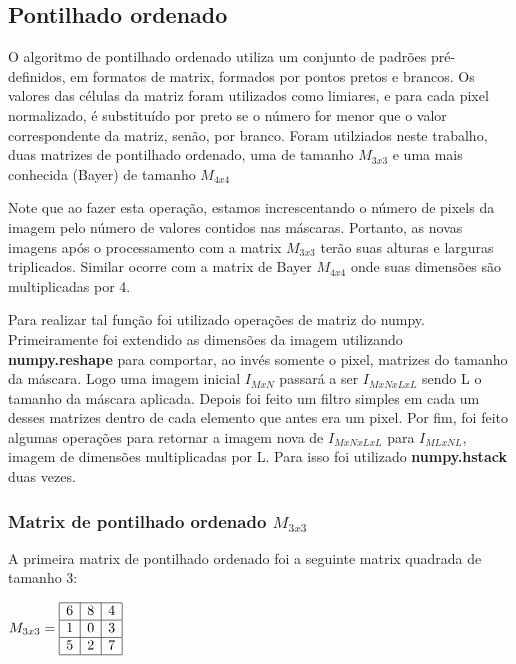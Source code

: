 \documentclass{article}
\begin{document}
\subsection{Pontilhado ordenado}

O algoritmo de pontilhado ordenado utiliza um conjunto de padrões pré-definidos, em formatos de matrix, formados por pontos pretos e brancos. Os valores das células da matriz foram utilizados como limiares, e para cada pixel normalizado, é substituído por preto se o número for menor que o valor correspondente da matriz, senão, por branco. Foram utilziados neste trabalho, duas matrizes de pontilhado ordenado, uma de tamanho $ M_{3x3} $ e uma mais conhecida (Bayer) de tamanho $ M_{4x4} $

Note que ao fazer esta operação, estamos increscentando o número de pixels da imagem pelo número de valores contidos nas máscaras. Portanto, as novas imagens após o processamento com a matrix $ M_{3x3} $ terão suas alturas e larguras triplicados. Similar ocorre com a matrix de Bayer $ M_{4x4} $ onde suas dimensões são multiplicadas por 4. 

Para realizar tal função foi utilizado operações de matriz do numpy. Primeiramente foi extendido as dimensões da imagem utilizando \textbf{numpy.reshape} para comportar, ao invés somente  o pixel, matrizes do tamanho da máscara. Logo uma imagem inicial $ I_{MxN} $ passará a ser $ I_{MxNxLxL} $ sendo L o tamanho da máscara aplicada. Depois foi feito um filtro simples em cada um desses matrizes dentro de cada elemento que antes era um pixel. Por fim, foi feito algumas operações para retornar a imagem nova de $ I_{MxNxLxL} $ para $ I_{MLxNL} $, imagem de dimensões multiplicadas por L. Para isso foi utilizado \textbf{numpy.hstack} duas vezes.

\subsubsection{Matrix de pontilhado ordenado $ M_{3x3} $}

A primeira matrix de pontilhado ordenado foi a seguinte matrix quadrada de tamanho 3:

\begin{center}
$
M_{3x3} = \begin{array}{|c|c|c|}
  \hline
  6 & 8 & 4 \\ 
  \hline
  1 & 0 & 3 \\ 
  \hline
  5 & 2 & 7 \\ 
  \hline
 \end{array}
$
\end{center}
\end{document}

